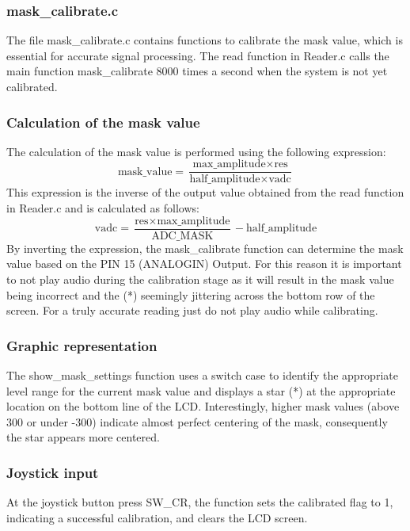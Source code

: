 \documentclass{cce2014-design}
\begin{document}
{{	  \subsubsection{mask\_calibrate.c}
	  The file mask\_calibrate.c contains functions to calibrate
	  the mask value, which is essential for accurate signal
	  processing. The read function in Reader.c calls the main
	  function mask\_calibrate 8000 times a second when the
	  system is not yet calibrated.

	  \subsubsection{Calculation of the mask value}
	  The calculation of the mask value is performed
	  using the following expression:
	  \begin{equation}
		  \text{mask\_value} = \frac{\text{max\_amplitude} \times
			  \text{res}}{\text{half\_amplitude} \times
			  \text{vadc}}
	  \end{equation}
	  This expression is the inverse of the output value
	  obtained from the read function in Reader.c and is
	  calculated as follows:
	  \begin{equation}
		  \text{vadc} = \frac{\text{res} \times
			  \text{max\_amplitude}}{\text{ADC\_MASK}} -
		  \text{half\_amplitude}
	  \end{equation}
	  By inverting the expression, the mask\_calibrate function
	  can determine the mask value based on the PIN 15 (ANALOGIN) Output.
	  For this
	  reason it is important to not play audio during the calibration stage
	  as it
	  will result in the mask value being incorrect and the (*) seemingly
	  jittering across the
	  bottom row of the screen. For a truly accurate reading just do not
	  play audio while calibrating.

	  \subsubsection{Graphic representation}
	  The show\_mask\_settings function uses a switch case
	  to identify the appropriate level range for the current
	  mask value and displays a star (*) at the appropriate
	  location on the bottom line of the LCD. Interestingly,
	  higher mask values (above 300 or under -300) indicate
	  almost perfect centering of the mask, consequently the
	  star appears more centered.

	  \subsubsection{Joystick input}
	  At the joystick button press SW\_CR, the function sets
	  the calibrated flag to 1, indicating a successful
	  calibration, and clears the LCD screen.

}}
\end{document}
